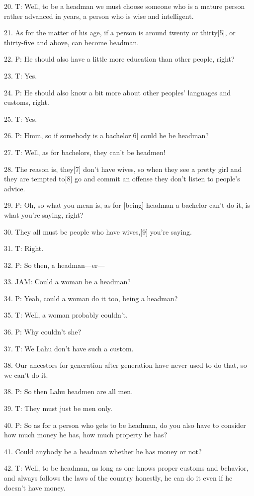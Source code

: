 {20. T: Well, to be a headman we must choose someone who is a mature person
rather advanced in years, a person who is wise and intelligent.}

{21. As for the matter of his age, if a person is around twenty or thirty[5],
or thirty-five and above, can become headman.}

{22. P: He should also have a little more education than other people, right?}

{23. T: Yes.}

{24. P: He should also know a bit more about other peoples' languages and
customs, right.}

{25. T: Yes.}

{26. P: Hmm, so if somebody is a bachelor[6] could he be headman?}

{27. T: Well, as for bachelors, they can't be headmen!}

{28. The reason is, they[7] don't have wives, so when they see a pretty
girl and they are tempted to[8] go and commit an offense they don't listen to people's
advice.}

{29. P: Oh, so what you mean is, as for [being] headman a bachelor can't
do it, is what you're saying, right?}

{30. They all must be people who have wives,[9] you're saying.}

{31. T: Right.}

{32. P: So then, a headman---er---}

{33. JAM: Could a woman be a headman?}

{34. P: Yeah, could a woman do it too, being a headman?}

{35. T: Well, a woman probably couldn't.}

{36. P: Why couldn't she?}

{37. T: We Lahu don't have such a custom.}

{38. Our ancestors for generation after generation have never used to do
that, so we can't do it.}

{38. P: So then Lahu headmen are all men.}

{39. T: They must just be men only.}

{40. P: So as for a person who gets to be headman, do you also have to consider
how much money he has, how much property he has?}

{41. Could anybody be a headman whether he has money or not?}

{42. T: Well, to be headman, as long as one knows proper customs and behavior,
and always follows the laws of the country honestly, he can do it even if he doesn't
have money.}

